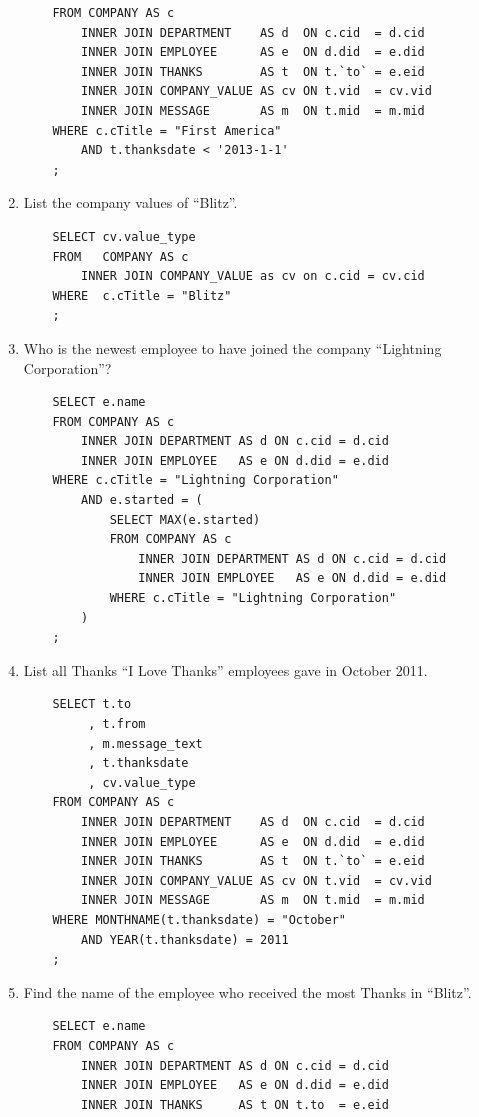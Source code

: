 \documentclass[11pt]{report}
\begin{document}
\begin{enumerate}
\begin{verbatim}
    FROM COMPANY AS c
        INNER JOIN DEPARTMENT    AS d  ON c.cid  = d.cid
        INNER JOIN EMPLOYEE      AS e  ON d.did  = e.did
        INNER JOIN THANKS        AS t  ON t.`to` = e.eid
        INNER JOIN COMPANY_VALUE AS cv ON t.vid  = cv.vid
        INNER JOIN MESSAGE       AS m  ON t.mid  = m.mid
    WHERE c.cTitle = "First America"
        AND t.thanksdate < '2013-1-1'
    ;
    \end{verbatim}
    \item List the company values of ``Blitz''.
    \begin{verbatim}
    SELECT cv.value_type
    FROM   COMPANY AS c
        INNER JOIN COMPANY_VALUE as cv on c.cid = cv.cid
    WHERE  c.cTitle = "Blitz"
    ;
    \end{verbatim}
    \item Who is the newest employee to have joined the company ``Lightning Corporation''?
    \begin{verbatim}
    SELECT e.name
    FROM COMPANY AS c
        INNER JOIN DEPARTMENT AS d ON c.cid = d.cid
        INNER JOIN EMPLOYEE   AS e ON d.did = e.did
    WHERE c.cTitle = "Lightning Corporation"
        AND e.started = (
            SELECT MAX(e.started)
            FROM COMPANY AS c
                INNER JOIN DEPARTMENT AS d ON c.cid = d.cid
                INNER JOIN EMPLOYEE   AS e ON d.did = e.did
            WHERE c.cTitle = "Lightning Corporation"
        )
    ;
    \end{verbatim}
    \item List all Thanks ``I Love Thanks'' employees gave in October 2011.
    \begin{verbatim}
    SELECT t.to
         , t.from
         , m.message_text
         , t.thanksdate
         , cv.value_type
    FROM COMPANY AS c
        INNER JOIN DEPARTMENT    AS d  ON c.cid  = d.cid
        INNER JOIN EMPLOYEE      AS e  ON d.did  = e.did
        INNER JOIN THANKS        AS t  ON t.`to` = e.eid
        INNER JOIN COMPANY_VALUE AS cv ON t.vid  = cv.vid
        INNER JOIN MESSAGE       AS m  ON t.mid  = m.mid
    WHERE MONTHNAME(t.thanksdate) = "October"
        AND YEAR(t.thanksdate) = 2011
    ;
    \end{verbatim}
    \item Find the name of the employee who received the most Thanks in ``Blitz''.
    \begin{verbatim}
    SELECT e.name
    FROM COMPANY AS c
        INNER JOIN DEPARTMENT AS d ON c.cid = d.cid
        INNER JOIN EMPLOYEE   AS e ON d.did = e.did
        INNER JOIN THANKS     AS t ON t.to  = e.eid

\end{verbatim}
\end{enumerate}
\end{document}
